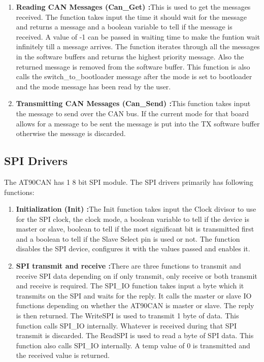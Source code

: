 \begin{enumerate}
\item \textbf{Reading CAN Messages (Can\_Get) :}This is used to get the messages received. The function takes input the time it should wait for the message and returns a message and a boolean variable to tell if the message is received. A value of -1 can be passed in waiting time to make the funtion wait infinitely till a message arrives. The function iterates through all the messages in the software buffers and returns the highest priority message. Also the returned message is removed from the software buffer. This function is also calls the switch\_to\_bootloader message after the mode is set to bootloader and the mode message has been read by the user.
\item \textbf{Transmitting CAN Messages (Can\_Send) :}This function takes input the message to send over the CAN bus. If the current mode for that board allows for a message to be sent the message is put into the TX software buffer otherwise the message is discarded.
\end{enumerate}

\subsection{SPI Drivers}
The AT90CAN has 1 8 bit SPI module. The SPI drivers primarily has following functions:
\begin{enumerate}
\item \textbf{Initialization (Init) :}The Init function takes input the Clock divisor to use for the SPI clock, the clock mode, a boolean variable to tell if the device is master or slave, boolean to tell if the most significant bit is transmitted first and a boolean to tell if the Slave Select pin is used or not. The function disables the SPI device, configures it with the values passed and enables it.
\item \textbf{SPI transmit and receive :}There are three functions to transmit and receive SPI data depending on if only transmit, only receive or both transmit and receive is required. 
The SPI\_IO function takes input a byte which it transmits on the SPI and waits for the reply. It calls the master or slave IO functions depending on whether the AT90CAN is master or slave. The reply is then returned. \newline
The WriteSPI is used to transmit 1 byte of data. This function calls SPI\_IO internally. Whatever is received during that SPI transmit is discarded. \newline
The ReadSPI is used to read a byte of SPI data. This function also calls SPI\_IO internally. A temp value of 0 is transmitted and the received value is returned.

\end{enumerate}